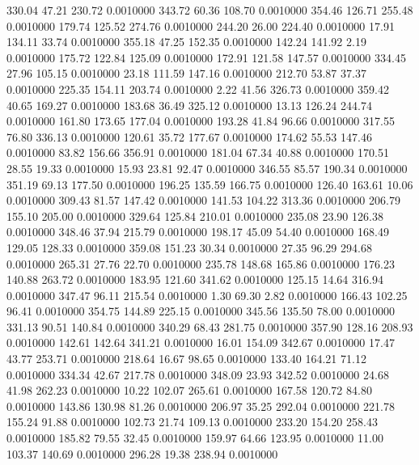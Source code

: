  330.04   47.21  230.72   0.0010000
 343.72   60.36  108.70   0.0010000
 354.46  126.71  255.48   0.0010000
 179.74  125.52  274.76   0.0010000
 244.20   26.00  224.40   0.0010000
  17.91  134.11   33.74   0.0010000
 355.18   47.25  152.35   0.0010000
 142.24  141.92    2.19   0.0010000
 175.72  122.84  125.09   0.0010000
 172.91  121.58  147.57   0.0010000
 334.45   27.96  105.15   0.0010000
  23.18  111.59  147.16   0.0010000
 212.70   53.87   37.37   0.0010000
 225.35  154.11  203.74   0.0010000
   2.22   41.56  326.73   0.0010000
 359.42   40.65  169.27   0.0010000
 183.68   36.49  325.12   0.0010000
  13.13  126.24  244.74   0.0010000
 161.80  173.65  177.04   0.0010000
 193.28   41.84   96.66   0.0010000
 317.55   76.80  336.13   0.0010000
 120.61   35.72  177.67   0.0010000
 174.62   55.53  147.46   0.0010000
  83.82  156.66  356.91   0.0010000
 181.04   67.34   40.88   0.0010000
 170.51   28.55   19.33   0.0010000
  15.93   23.81   92.47   0.0010000
 346.55   85.57  190.34   0.0010000
 351.19   69.13  177.50   0.0010000
 196.25  135.59  166.75   0.0010000
 126.40  163.61   10.06   0.0010000
 309.43   81.57  147.42   0.0010000
 141.53  104.22  313.36   0.0010000
 206.79  155.10  205.00   0.0010000
 329.64  125.84  210.01   0.0010000
 235.08   23.90  126.38   0.0010000
 348.46   37.94  215.79   0.0010000
 198.17   45.09   54.40   0.0010000
 168.49  129.05  128.33   0.0010000
 359.08  151.23   30.34   0.0010000
  27.35   96.29  294.68   0.0010000
 265.31   27.76   22.70   0.0010000
 235.78  148.68  165.86   0.0010000
 176.23  140.88  263.72   0.0010000
 183.95  121.60  341.62   0.0010000
 125.15   14.64  316.94   0.0010000
 347.47   96.11  215.54   0.0010000
   1.30   69.30    2.82   0.0010000
 166.43  102.25   96.41   0.0010000
 354.75  144.89  225.15   0.0010000
 345.56  135.50   78.00   0.0010000
 331.13   90.51  140.84   0.0010000
 340.29   68.43  281.75   0.0010000
 357.90  128.16  208.93   0.0010000
 142.61  142.64  341.21   0.0010000
  16.01  154.09  342.67   0.0010000
  17.47   43.77  253.71   0.0010000
 218.64   16.67   98.65   0.0010000
 133.40  164.21   71.12   0.0010000
 334.34   42.67  217.78   0.0010000
 348.09   23.93  342.52   0.0010000
  24.68   41.98  262.23   0.0010000
  10.22  102.07  265.61   0.0010000
 167.58  120.72   84.80   0.0010000
 143.86  130.98   81.26   0.0010000
 206.97   35.25  292.04   0.0010000
 221.78  155.24   91.88   0.0010000
 102.73   21.74  109.13   0.0010000
 233.20  154.20  258.43   0.0010000
 185.82   79.55   32.45   0.0010000
 159.97   64.66  123.95   0.0010000
  11.00  103.37  140.69   0.0010000
 296.28   19.38  238.94   0.0010000
